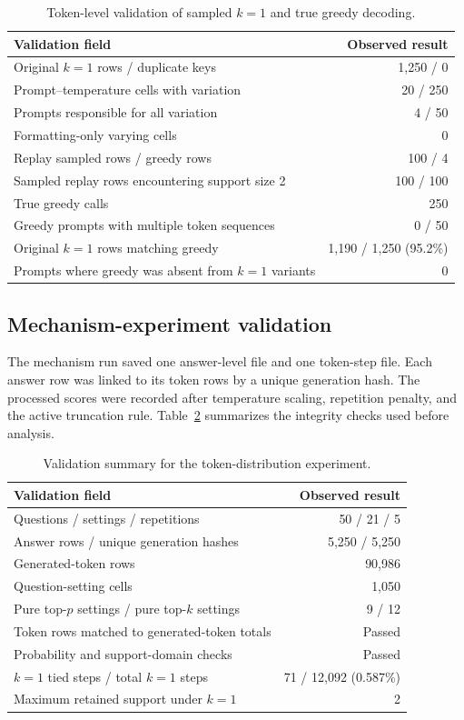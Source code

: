 \documentclass[11pt]{article}
\begin{document}
\begin{table}[ht]
\centering
\small
\caption{Token-level validation of sampled $k=1$ and true greedy decoding.}
\label{tab:k1-forensic}
\begin{tabular}{lr}
\toprule
Validation field & Observed result \\
\midrule
Original $k=1$ rows / duplicate keys & 1,250 / 0 \\
Prompt--temperature cells with variation & 20 / 250 \\
Prompts responsible for all variation & 4 / 50 \\
Formatting-only varying cells & 0 \\
Replay sampled rows / greedy rows & 100 / 4 \\
Sampled replay rows encountering support size 2 & 100 / 100 \\
True greedy calls & 250 \\
Greedy prompts with multiple token sequences & 0 / 50 \\
Original $k=1$ rows matching greedy & 1,190 / 1,250 (95.2\%) \\
Prompts where greedy was absent from $k=1$ variants & 0 \\
\bottomrule
\end{tabular}
\end{table}

\subsection{Mechanism-experiment validation}

The mechanism run saved one answer-level file and one token-step file. Each
answer row was linked to its token rows by a unique generation hash. The
processed scores were recorded after temperature scaling, repetition penalty,
and the active truncation rule. Table~\ref{tab:mechanism-validation} summarizes
the integrity checks used before analysis.

\begin{table}[ht]
\centering
\small
\caption{Validation summary for the token-distribution experiment.}
\label{tab:mechanism-validation}
\begin{tabular}{lr}
\toprule
Validation field & Observed result \\
\midrule
Questions / settings / repetitions & 50 / 21 / 5 \\
Answer rows / unique generation hashes & 5,250 / 5,250 \\
Generated-token rows & 90,986 \\
Question-setting cells & 1,050 \\
Pure top-$p$ settings / pure top-$k$ settings & 9 / 12 \\
Token rows matched to generated-token totals & Passed \\
Probability and support-domain checks & Passed \\
$k=1$ tied steps / total $k=1$ steps & 71 / 12,092 (0.587\%) \\
Maximum retained support under $k=1$ & 2 \\
\bottomrule
\end{tabular}
\end{table}
\end{document}
